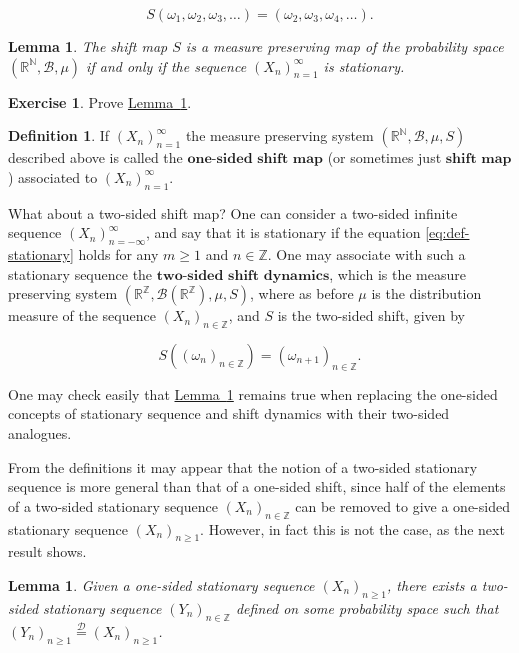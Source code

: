 \documentclass[11pt]{report}
\newcommand{\R}{\mathbb{R}}
\newcommand{\Z}{\mathbb{Z}}
\newcommand{\N}{\mathbb{N}}
\theoremstyle{plain}
\newtheorem{lem}[thm]{Lemma}
\theoremstyle{definition}
\newtheorem{defn}[thm]{Definition}
\newtheorem{xexercise}[thm]{Exercise}
\begin{document}
\[
S(\omega_1,\omega_2, \omega_3, \ldots) = (\omega_2,\omega_3,\omega_4, \ldots).
\]

\begin{lem}
\label{lem-shift-stationary}
The shift map $S$ is a measure preserving map of the
probability space $(\R^\N,\mathcal{B},\mu)$ if and
only if the sequence $(X_n)_{n=1}^\infty$ is
stationary.
\end{lem}

\begin{xexercise}
Prove \hyperref[lem-shift-stationary]{Lemma~\ref*{lem-shift-stationary}}.
\end{xexercise}

\begin{defn}
If $(X_n)_{n=1}^\infty$ the measure preserving system
$(\R^\N,\mathcal{B},\mu,S)$ described above is called
the $\textbf{one-sided shift map}$ (or sometimes just
$\textbf{shift map}$) associated to
$(X_n)_{n=1}^\infty$.
\end{defn}

\noindent What about a two-sided shift map? One can consider a
two-sided infinite sequence
$(X_n)_{n=-\infty}^\infty$, and say that it is
stationary if the equation \eqref{eq:def-stationary} holds
for any $m\ge1$ and $n\in\Z$. One may associate with
such a stationary sequence the
$\textbf{two-sided shift dynamics}$, which is the
measure preserving system
$(\R^\Z,\mathcal{B}(\R^\Z), \mu, S)$, where as before
$\mu$ is the distribution measure of the sequence
$(X_n)_{n\in\Z}$, and $S$ is the two-sided shift,
given by

\[
S((\omega_n)_{n\in\Z}) = (\omega_{n+1})_{n\in\Z}.
\]

\noindent One may check easily that \texorpdfstring{\hyperref[lem-shift-stationary]{Lemma~\ref*{lem-shift-stationary}}}{Lemma} remains true when replacing the
one-sided concepts of stationary sequence and shift
dynamics with their two-sided analogues.

From the definitions it may appear that the notion of
a two-sided stationary sequence is more general than
that of a one-sided shift, since half of the elements
of a two-sided stationary sequence $(X_n)_{n\in\Z}$
can be removed to give a one-sided stationary sequence
$(X_n)_{n\ge 1}$. However, in fact this is not the
case, as the next result shows.

\begin{lem}
Given a one-sided stationary sequence
$(X_n)_{n\ge 1}$, there exists a two-sided stationary
sequence $(Y_n)_{n\in\Z}$ defined on some probability
space such that
$(Y_n)_{n\ge1} \stackrel{\mathcal{D}}{=}
(X_n)_{n\ge1}$.
\end{lem}
\end{document}
